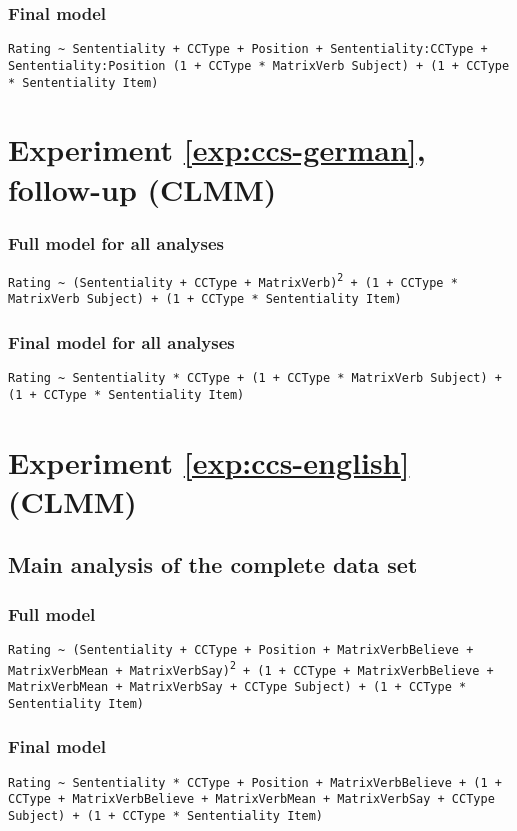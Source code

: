 \subsubsection*{Final model}
\texttt{Rating \textasciitilde {} Sententiality + CCType + Position + Sententiality:CCType + Sententiality:Position (1 + CCType * MatrixVerb  {}\textbar {} Subject) + (1 + CCType * Sententiality  {}\textbar {} Item)}

\section*{Experiment \ref{exp:ccs-german}, follow-up (CLMM)}
\subsubsection{Full model for all analyses}
\texttt{Rating \textasciitilde {} (Sententiality + CCType +  MatrixVerb)\textsuperscript{2} + (1 + CCType * MatrixVerb  {}\textbar {} Subject) + (1 + CCType * Sententiality  {}\textbar {} Item)}

\subsubsection{Final model for all analyses}
\texttt{Rating \textasciitilde {} Sententiality * CCType + (1 + CCType * MatrixVerb  {}\textbar {} Subject) + (1 + CCType * Sententiality  {}\textbar {} Item)}

\section*{Experiment \ref{exp:ccs-english} (CLMM)}
\subsection*{Main analysis of the complete data set}
\subsubsection*{Full model}
\texttt{Rating \textasciitilde {} (Sententiality + CCType + Position + MatrixVerbBelieve + MatrixVerbMean + MatrixVerbSay)\textsuperscript{2} + (1 + CCType + MatrixVerbBelieve + MatrixVerbMean + MatrixVerbSay + CCType  {}\textbar {} Subject) + (1 + CCType * Sententiality  {}\textbar {} Item)}

\subsubsection*{Final model}
\texttt{Rating \textasciitilde {} Sententiality * CCType + Position + MatrixVerbBelieve + (1 + CCType + MatrixVerbBelieve + MatrixVerbMean + MatrixVerbSay  + CCType  {}\textbar {} Subject) + (1 + CCType * Sententiality  {}\textbar {} Item)}

